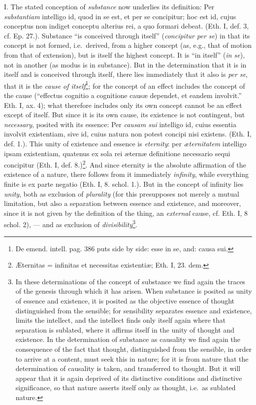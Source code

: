 \documentclass[12pt,a4paper,openany]{book}
\newcommand{\opage}[1]{\marginnote{\footnotesize\textit{[#1]}}}
\begin{document}
I. The stated conception of \emph{substance} now underlies
its definition: Per \emph{substantiam} intelligo id, quod in se est,
et per se concipitur; hoc est id, cujus conceptus non indiget conceptu
alterius rei, a quo formari debeat. (Eth. I, def. 3, cf. Ep. 27.).
Substance ``is conceived through itself'' (\emph{concipitur per se}) in that
its concept is not formed, i.e.\ derived, from a higher concept (as, e.g.,
that of motion from that of extension), but is itself the highest concept. It
is ``in itself'' (\emph{in se}), not in another (as modus is in
substance).
But in the determination that it is in itself and is conceived through itself,
there \opage{45}\setcounter{footnote}{0}lies immediately that it also is \emph{per se}, that it is the
\emph{cause of itself}\footnote{De emend. intell. pag. 386
puts side by side: esse in se, and: causa sui.}; for the concept of an effect
includes the concept of the cause (``effectus cognitio a cognitione causæ
dependet, et eandem involvit.'' Eth. I, ax. 4); what therefore includes only its own concept cannot be an effect except of itself. %
But since it is its own cause, its existence is not contingent, but
\emph{necessary}, posited with its essence: Per \emph{causam sui} intelligo id,
cuius essentia involvit existentiam, sive id, cuius natura non potest
concipi nisi existens. (Eth. I, def. 1.). This unity of existence and
essence is \emph{eternity}: per \emph{æternitatem} intelligo ipsam existentiam,
quatenus ex sola rei æternæ definitione necessario sequi concipitur
(Eth. I, def. 8.)\footnote{Æternitas = infinitas et necessitas
existentiæ; Eth. I, 23. dem.}. And since eternity is the absolute
affirmation of the existence of a nature, there follows from it immediately
\emph{infinity}, while everything finite is ex parte negatio (Eth. I,
8. schol. 1.). But in the concept of infinity lies \emph{unity}, both
as exclusion of \emph{plurality} (for this presupposes not merely a
mutual limitation, but also a separation between essence and
existence, and moreover, since it is not given by the definition of the thing, an
\emph{external} cause, cf. Eth. I, 8 schol. 2), --- and as exclusion of
\emph{divisibility}\footnote{In these determinations of the concept of substance
we find again the traces of the genesis through which it has arisen.
When substance is posited as unity of essence and existence, it is posited as
the objective essence of thought distinguished from the sensible; for
sensibility separates essence and existence, limits the intellect, and
the intellect finds only itself again where that separation is sublated, where it
affirms itself in the unity of thought and existence. In the determination of
substance as causality we find again the consequence of the fact that thought,
distinguished from the sensible, in order to arrive at a content, must seek
this in nature; for it is from nature that the determination of causality is taken, and
transferred to thought. But it will appear that it is again deprived of its
distinctive conditions and distinctive significance, so that nature
asserts itself only as thought, i.e.\ as sublated nature.}.
\end{document}
